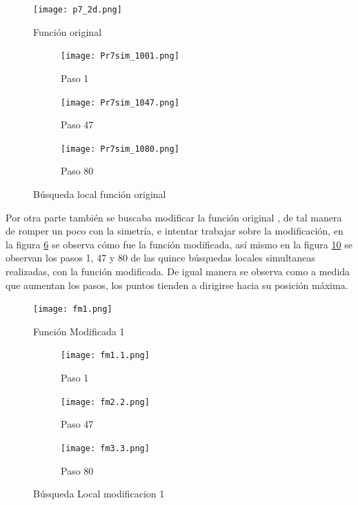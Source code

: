\documentclass{article}
\begin{document}
\begin{figure}[H]
       \begin{center}
           \texttt{[image: p7\_2d.png]}
       \end{center}
\caption{Funci\'on original}
        \label{f1}
\end{figure}

\begin{figure}[H]
       \centering
       \begin{subfigure}[b]{0.47\linewidth}
           \texttt{[image: Pr7sim\_1001.png]}
           \caption{Paso 1}
           \label{f2.a}
        \end{subfigure}
        \begin{subfigure}[b]{0.47\linewidth}
            \texttt{[image: Pr7sim\_1047.png]}
            \caption{Paso 47}	
            \label{f2.b}
        \end{subfigure}
\begin{subfigure}[b]{0.47\linewidth}
            \texttt{[image: Pr7sim\_1080.png]}
            \caption{Paso 80}
            \label{f2.b}
        \end{subfigure}
\caption{B\'usqueda local funci\'on original}
        \label{f2}
\end{figure}

Por otra parte tambi\'en se buscaba modificar la funci\'on original \citep{elisaclass}, de tal manera de romper un poco con la simetr\'ia, e intentar trabajar sobre la modificaci\'on, en la figura \ref{f3} se observa c\'omo fue la funci\'on modificada, as\'i mismo en la figura \ref{f4} se observan los pasos 1, 47 y 80 de las quince b\'usquedas locales simultaneas realizadas, con la funci\'on modificada. De igual manera se observa como a medida que aumentan los pasos, los puntos tienden a dirigirse hacia su posici\'on m\'axima.

  \begin{figure}[H]
       \begin{center}
           \texttt{[image: fm1.png]}
       \end{center}
\caption{Funci\'on Modificada 1}
        \label{f3}
\end{figure}

\begin{figure}[H]
       \centering
       \begin{subfigure}[b]{0.47\linewidth}
           \texttt{[image: fm1.1.png]}
           \caption{Paso 1}
           \label{f3.a}
        \end{subfigure}
        \begin{subfigure}[b]{0.47\linewidth}
            \texttt{[image: fm2.2.png]}
            \caption{Paso 47}	
            \label{f3.b}
        \end{subfigure}
\begin{subfigure}[b]{0.47\linewidth}
            \texttt{[image: fm3.3.png]}
            \caption{Paso 80}
            \label{f3.b}
        \end{subfigure}
\caption{B\'usqueda Local modificacion 1}
        \label{f4}
\end{figure}
\end{document}
